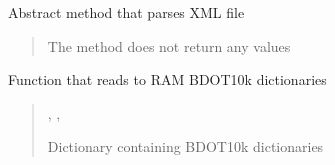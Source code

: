 \documentclass[letterpaper,10pt,english]{sphinxmanual}
\begin{document}
\begin{fulllineitems}
\begin{fulllineitems}
\end{fulllineitems}


\begin{fulllineitems}
\label{\detokenize{xml_parsers:xml_parsers.XmlParser.parse_xml}}
\pysigstartsignatures
{}
\pysigstopsignatures
\sphinxAtStartPar
Abstract method that parses XML file
\begin{quote}\begin{description}
\sphinxAtStartPar
{}

\sphinxAtStartPar
The method does not return any values

\end{description}\end{quote}

\end{fulllineitems}


\end{fulllineitems}


\begin{fulllineitems}
\label{\detokenize{xml_parsers:xml_parsers.read_bdot10k_dicts}}
\pysigstartsignatures
{}
\pysigstopsignatures
\sphinxAtStartPar
Function that reads to RAM BDOT10k dictionaries
\begin{quote}\begin{description}
\sphinxAtStartPar
\sphinxcode{\sphinxupquote{Dict}}{[}, \sphinxcode{\sphinxupquote{Dict}}{[}, \sphinxcode{\sphinxupquote{ndarray}}{]}{]}

\sphinxAtStartPar
Dictionary containing BDOT10k dictionaries

\end{description}\end{quote}

\end{fulllineitems}
\end{document}

